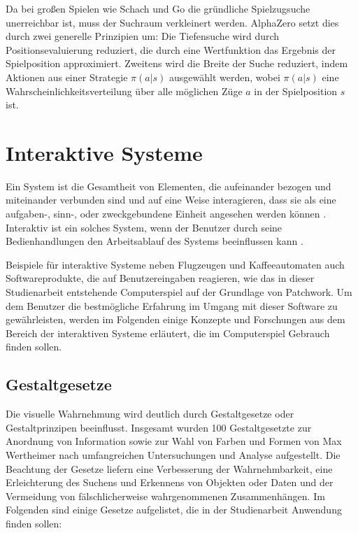 Da bei großen Spielen wie Schach und Go die gründliche Spielzugsuche unerreichbar ist, muss der Suchraum verkleinert werden. AlphaZero setzt dies durch zwei generelle Prinzipien um: Die Tiefensuche wird durch Positionsevaluierung reduziert, die durch eine Wertfunktion das Ergebnis der Spielposition approximiert. Zweitens wird die Breite der Suche reduziert, indem Aktionen aus einer Strategie $\pi(a|s)$ ausgewählt werden, wobei $\pi(a|s)$ eine Wahrscheinlichkeitsverteilung über alle möglichen Züge $a$ in der Spielposition $s$ ist. \cite{2016.AlphaGoPaper}

\section{Interaktive Systeme}
\label{chapter:interaktive-systeme}

Ein System ist die Gesamtheit von Elementen, die aufeinander bezogen und miteinander verbunden sind und auf eine Weise interagieren, dass sie als eine aufgaben-, sinn-, oder zweckgebundene Einheit angesehen werden können \cite{2014.Systeme}. Interaktiv ist ein solches System, wenn der Benutzer durch seine Bedienhandlungen den Arbeitsablauf des Systems beeinflussen kann \cite[S. 3]{2011.Heinecke}.

Beispiele für interaktive Systeme neben Flugzeugen und Kaffeeautomaten auch Softwareprodukte, die auf Benutzereingaben reagieren, wie das in dieser Studienarbeit entstehende Computerspiel auf der Grundlage von Patchwork. Um dem Benutzer die bestmögliche Erfahrung im Umgang mit dieser Software zu gewährleisten, werden im Folgenden einige Konzepte und Forschungen aus dem Bereich der interaktiven Systeme erläutert, die im Computerspiel Gebrauch finden sollen.

\subsection{Gestaltgesetze}
Die visuelle Wahrnehmung wird deutlich durch Gestaltgesetze oder Gestaltprinzipen beeinflusst. Insgesamt wurden 100 Gestaltgesetzte zur Anordnung von Information sowie zur Wahl von Farben und Formen von Max Wertheimer nach umfangreichen Untersuchungen und Analyse aufgestellt. Die Beachtung der Gesetze liefern eine Verbesserung der Wahrnehmbarkeit, eine Erleichterung des Suchens und Erkennens von Objekten oder Daten und der Vermeidung von fälschlicherweise wahrgenommenen Zusammenhängen. \cite[S. 55 f.]{2010.Preim} Im Folgenden sind einige Gesetze aufgelistet, die in der Studienarbeit Anwendung finden sollen:

